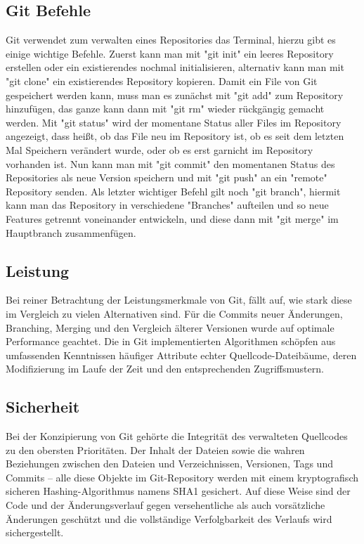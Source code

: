 \subsection{Git Befehle}

Git verwendet zum verwalten eines Repositories das Terminal, hierzu gibt es einige wichtige Befehle. Zuerst kann man mit "git init" ein leeres Repository erstellen 
oder ein existierendes nochmal initialisieren, alternativ kann man mit "git clone" ein existierendes Repository kopieren. Damit ein File von Git gespeichert werden
kann, muss man es zunächst mit "git add" zum Repository hinzufügen, das ganze kann dann mit "git rm" wieder rückgängig gemacht werden. Mit "git status" wird der 
momentane Status aller Files im Repository angezeigt, dass heißt, ob das File neu im Repository ist, ob es seit dem letzten Mal Speichern verändert wurde, oder ob es 
erst garnicht im Repository vorhanden ist. Nun kann man mit "git commit" den momentanen Status des Repositories als neue Version speichern und mit "git push" an ein "remote" 
Repository senden. Als letzter wichtiger Befehl gilt noch "git branch", hiermit kann man das Repository in verschiedene "Branches" aufteilen und so 
neue Features getrennt voneinander entwickeln, und diese dann mit "git merge" im Hauptbranch zusammenfügen.
\cite{sysarch-git-2}

\subsection{Leistung}

Bei reiner Betrachtung der Leistungsmerkmale von Git, fällt auf, wie stark diese im Vergleich zu vielen Alternativen sind. Für die Commits neuer 
Änderungen, Branching, Merging und den Vergleich älterer Versionen wurde auf optimale Performance geachtet. Die in Git implementierten Algorithmen schöpfen 
aus umfassenden Kenntnissen häufiger Attribute echter Quellcode-Dateibäume, deren Modifizierung im Laufe der Zeit und den entsprechenden Zugriffsmustern.
\cite{sysarch-git-1}

\subsection{Sicherheit}

Bei der Konzipierung von Git gehörte die Integrität des verwalteten Quellcodes zu den obersten Prioritäten. Der Inhalt der Dateien sowie die wahren Beziehungen 
zwischen den Dateien und Verzeichnissen, Versionen, Tags und Commits – alle diese Objekte im Git-Repository werden mit einem kryptografisch sicheren Hashing-Algorithmus namens SHA1 gesichert. 
Auf diese Weise sind der Code und der Änderungsverlauf gegen versehentliche als auch vorsätzliche Änderungen geschützt und die vollständige Verfolgbarkeit des Verlaufs wird sichergestellt.
\cite{sysarch-git-1}

